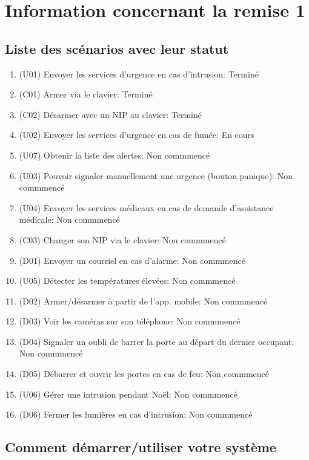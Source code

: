 
\chapter*{Information concernant la remise 1}

\section*{Liste des scénarios avec leur statut}
\begin{enumerate}
	\item (U01) Envoyer les services d'urgence en cas d'intrusion: Terminé
	\item (C01) Armer via le clavier: Terminé
	\item (C02) Désarmer avec un NIP au clavier: Terminé
	\item (U02) Envoyer les services d'urgence en cas de fumée: En cours
	\item (U07) Obtenir la liste des alertes: Non commmencé
	\item (U03) Pouvoir signaler manuellement une urgence (bouton panique): Non commmencé
	\item (U04) Envoyer les services médicaux en cas de demande d'assistance médicale: Non commmencé
	\item (C03) Changer son NIP via le clavier: Non commmencé
	\item (D01) Envoyer un courriel en cas d'alarme: Non commmencé
	\item (U05) Détecter les températures élevées: Non commmencé
	\item (D02) Armer/désarmer à partir de l'app. mobile: Non commmencé
	\item (D03) Voir les caméras sur son téléphone: Non commmencé
	\item (D04) Signaler un oubli de barrer la porte au départ du dernier occupant: Non commmencé
	\item (D05) Débarrer et ouvrir les portes en cas de feu: Non commmencé
	\item (U06) Gérer une intrusion pendant Noël: Non commmencé
	\item (D06) Fermer les lumières en cas d'intrusion: Non commmencé
\end{enumerate}

\section*{Comment démarrer/utiliser votre système}

